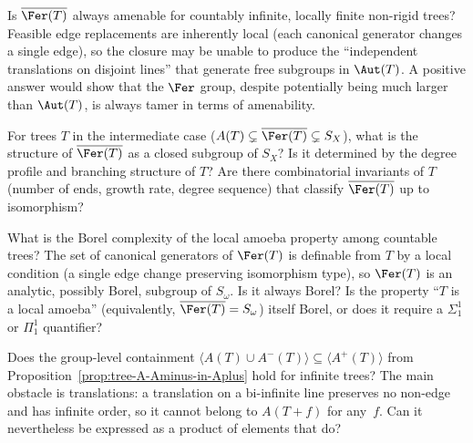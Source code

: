 \begin{question}\label{q:amenability-fer}
    Is $\overline{\Fer(T)}$ always amenable for countably infinite, locally finite non-rigid trees?
    Feasible edge replacements are inherently local (each canonical generator changes a single edge), so the closure may be unable to produce the ``independent translations on disjoint lines'' that generate free subgroups in $\Aut(T)$.
    A positive answer would show that the $\Fer$ group, despite potentially being much larger than $\Aut(T)$, is always tamer in terms of amenability.
\end{question}

\begin{question}\label{q:intermediate-closure}
    For trees $T$ in the intermediate case ($A(T)\subsetneq\overline{\Fer(T)}\subsetneq S_X$), what is the structure of $\overline{\Fer(T)}$ as a closed subgroup of $S_X$?
    Is it determined by the degree profile and branching structure of $T$?
    Are there combinatorial invariants of $T$ (number of ends, growth rate, degree sequence) that classify $\overline{\Fer(T)}$ up to isomorphism?
\end{question}

\begin{question}\label{q:borel-complexity}
    What is the Borel complexity of the local amoeba property among countable trees?
    The set of canonical generators of $\Fer(T)$ is definable from $T$ by a local condition (a single edge change preserving isomorphism type), so $\Fer(T)$ is an analytic, possibly Borel, subgroup of $S_\omega$.
    Is it always Borel?
    Is the property ``$T$ is a local amoeba'' (equivalently, $\overline{\Fer(T)}=S_\omega$) itself Borel, or does it require a $\Sigma^1_1$ or $\Pi^1_1$ quantifier?
\end{question}

\begin{question}\label{q:unicyclic-translations}
    Does the group-level containment $\langle A(T)\cup A^-(T)\rangle\subseteq\langle A^+(T)\rangle$ from Proposition~\ref{prop:tree-A-Aminus-in-Aplus} hold for infinite trees?
    The main obstacle is translations: a translation on a bi-infinite line preserves no non-edge and has infinite order, so it cannot belong to $A(T+f)$ for any~$f$.
    Can it nevertheless be expressed as a product of elements that do?
\end{question}